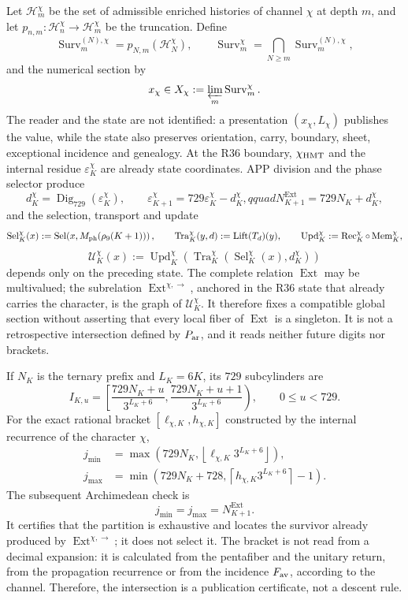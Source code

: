 Let \(\mathcal H_m^\chi\) be the set of admissible enriched histories
of channel \(\chi\) at depth \(m\), and let
\(p_{n,m}:\mathcal H_n^\chi\to\mathcal H_m^\chi\) be the truncation. Define
\[
 \operatorname{Surv}_{m}^{(N),\chi}
 =p_{N,m}(\mathcal H_N^\chi),\qquad
 \operatorname{Surv}_{m}^{\chi}
 =\bigcap_{N\ge m}\operatorname{Surv}_{m}^{(N),\chi},
\]
and the numerical section by
\[
 x_\chi\in X_\chi:=
 \varprojlim_m\operatorname{Surv}_m^\chi.
\]
The reader and the state are not identified: a presentation
\((x_\chi,L_\chi)\) publishes the value, while the state also preserves
orientation, carry, boundary, sheet, exceptional incidence and genealogy.
At the R36 boundary, \(\chi_{\rm HMT}\) and the internal residue
\(\varepsilon_K^\chi\) are already state coordinates. APP division and the
phase selector produce
\[
 d_K^\chi=\operatorname{Dig}_{729}(\varepsilon_K^\chi),\qquad
 \varepsilon_{K+1}^\chi=729\varepsilon_K^\chi-d_K^\chi,qquad
 N_{K+1}^{\operatorname{Ext}}=729N_K+d_K^\chi,
\]
and the selection, transport and update
\[
 \operatorname{Sel}_K^\chi(x)
 :=\operatorname{Sel}\!\left(
 x,M_{\rm ph}(\rho_9(K+1))\right),
 \qquad
 \operatorname{Tra}_K^\chi(y,d):=\operatorname{Lift}(T_d)(y),
 \qquad
 \operatorname{Upd}_K^\chi:=\operatorname{Rec}_K^\chi\circ
 \operatorname{Mem}_K^\chi,
\]
\[
 \mathcal U_K^\chi(x)
 :=\operatorname{Upd}_K^\chi\!\left(
  \operatorname{Tra}_K^\chi\!\left(
   \operatorname{Sel}_K^\chi(x),d_K^\chi
  \right)\right)
\]
depends only on the preceding state. The complete relation
\(\operatorname{Ext}\) may be multivalued; the subrelation
\(\operatorname{Ext}^{\chi,\rightarrow}\), anchored in the R36 state that already
carries the character, is the graph of \(\mathcal U_K^\chi\). It therefore fixes
a compatible global section without asserting that every local fiber of
\(\operatorname{Ext}\) is a singleton. It is not a retrospective intersection defined by
\(P_{\rm ar}\), and it reads neither future digits nor brackets.

If \(N_K\) is the ternary prefix and \(L_K=6K\), its \(729\) subcylinders are
\[
 I_{K,u}=
 \left[
 \frac{729N_K+u}{3^{L_K+6}},
 \frac{729N_K+u+1}{3^{L_K+6}}
 \right),
 \qquad 0\le u<729.
\]
For the exact rational bracket \([\ell_{\chi,K},h_{\chi,K}]\) constructed by the internal
recurrence of the character \(\chi\),
\[
\begin{aligned}
j_{\min}
 &=\max\!\left(729N_K,
   \left\lfloor\ell_{\chi,K}3^{L_K+6}\right\rfloor\right),\\
j_{\max}
 &=\min\!\left(729N_K+728,
   \left\lceil h_{\chi,K}3^{L_K+6}\right\rceil-1\right).
\end{aligned}
\]
The subsequent Archimedean check is
\[
 j_{\min}=j_{\max}=N_{K+1}^{\operatorname{Ext}}.
\]
It certifies that the partition is exhaustive and locates the survivor already
produced by \(\operatorname{Ext}^{\chi,\rightarrow}\); it does not select it.
The bracket is not read from a decimal expansion: it is calculated
from the pentafiber and the unitary return, from the propagation recurrence
or from the incidence \(F_{\rm av}\), according to the channel. Therefore, the
intersection is a publication certificate, not a descent rule.


